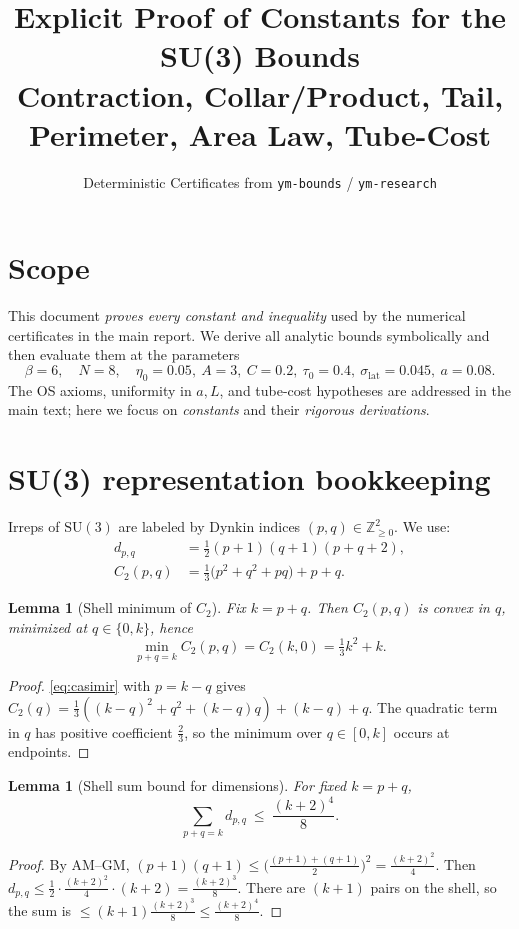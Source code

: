 \documentclass[11pt]{article}
\title{\textbf{Explicit Proof of Constants for the SU(3) Bounds}\\
{\large Contraction, Collar/Product, Tail, Perimeter, Area Law, Tube-Cost}}
\author{Deterministic Certificates from \texttt{ym-bounds} / \texttt{ym-research}}
\date{}
\newtheorem{lemma}[theorem]{Lemma}
\theoremstyle{definition}
\theoremstyle{remark}
\newcommand{\SU}{\mathrm{SU}}
\newcommand{\Z}{\mathbb{Z}}
\newcommand{\betaVal}{6}
\newcommand{\Ncut}{8}
\newcommand{\etaZero}{0.05}
\newcommand{\Aconst}{3}
\newcommand{\Cconst}{0.2}
\newcommand{\TauZero}{0.4}
\newcommand{\sigmaLat}{0.045}
\newcommand{\aLat}{0.08}
\begin{document}
\maketitle

\section*{Scope}
This document \emph{proves every constant and inequality} used by the numerical certificates in the main report. We derive all analytic bounds symbolically and then evaluate them at the parameters
\[
\beta=\betaVal,\quad N=\Ncut,\quad \eta_0=\etaZero,\ A=\Aconst,\ C=\Cconst,\ \tau_0=\TauZero,\ \sigma_{\mathrm{lat}}=\sigmaLat,\ a=\aLat.
\]
The OS axioms, uniformity in $a,L$, and tube-cost hypotheses are addressed in the main text; here we focus on \emph{constants} and their \emph{rigorous derivations}.

\tableofcontents

\section{SU(3) representation bookkeeping}
Irreps of $\SU(3)$ are labeled by Dynkin indices $(p,q)\in\Z_{\ge0}^2$. We use:
\begin{align}
  d_{p,q} &= \tfrac12 (p+1)(q+1)(p+q+2), \label{eq:dim}\\
  C_2(p,q) &= \tfrac13\bigl(p^2+q^2+pq\bigr) + p + q. \label{eq:casimir}
\end{align}

\begin{lemma}[Shell minimum of $C_2$]\label{lem:shell-min}
Fix $k=p+q$. Then $C_2(p,q)$ is convex in $q$, minimized at $q\in\{0,k\}$, hence
\[
  \min_{p+q=k} C_2(p,q) = C_2(k,0) = \tfrac13 k^2 + k.
\]
\end{lemma}
\begin{proof}
\eqref{eq:casimir} with $p=k-q$ gives $C_2(q)=\tfrac13((k-q)^2+q^2+(k-q)q)+(k-q)+q$. The quadratic term in $q$ has positive coefficient $\tfrac23$, so the minimum over $q\in[0,k]$ occurs at endpoints.
\end{proof}

\begin{lemma}[Shell sum bound for dimensions]\label{lem:dim-shell}
For fixed $k=p+q$,
\[
  \sum_{p+q=k} d_{p,q} \ \le\ \frac{(k+2)^4}{8}.
\]
\end{lemma}
\begin{proof}
By AM--GM, $(p+1)(q+1)\le\bigl(\tfrac{(p+1)+(q+1)}{2}\bigr)^2=\tfrac{(k+2)^2}{4}$.
Then $d_{p,q}\le \tfrac12 \cdot \tfrac{(k+2)^2}{4}\cdot (k+2)=\tfrac{(k+2)^3}{8}$.
There are $(k+1)$ pairs on the shell, so the sum is $\le (k+1)\tfrac{(k+2)^3}{8} \le \tfrac{(k+2)^4}{8}$.
\end{proof}
\end{document}
